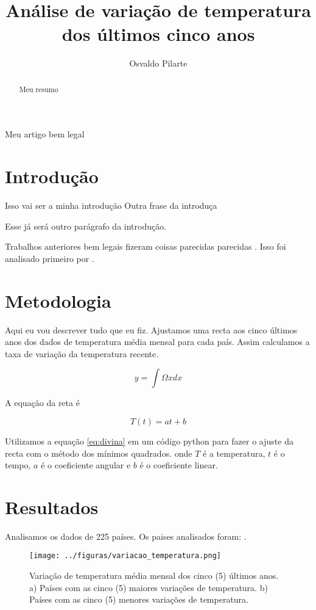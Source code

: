 \documentclass{article}
\begin{document}
\title{Análise de variação de temperatura dos últimos cinco anos}
\author{Osvaldo Pilarte}

\maketitle

\begin{abstract}
Meu resumo
\end{abstract}

Meu artigo bem legal

\section{Introdução}

Isso vai ser a minha introdução
Outra frase da introduça


Esse já será outro parágrafo da introdução.

Trabalhos anteriores bem legais fizeram coisas parecidas parecidas
\citep{Tohver_2006}.
Isso foi analisado primeiro por \citep{Tohver_2006}.

\section{Metodologia}

Aqui eu vou descrever tudo que eu fiz.
Ajustamos uma recta aos cinco últimos anos dos dados
de temperatura média mensal para cada país.
Assim calculamos a taxa de variação da temperatura recente.

\begin{equation}
y=\int\Omega x dx
\end{equation}

A equação da reta é

\begin{equation}
T(t) = a t + b
\label{eq:divina}
\end{equation}

\noindent

Utilizamos a equação \ref{eq:divina} em um código python para fazer o ajuste da recta com o método dos mínimos quadrados.
onde $T$ é a temperatura, $t$ é o tempo, $a$ é o coeficiente angular e $b$ é o coeficiente linear.

\section{Resultados}

Analisamos os dados de 225 países.
Os paises analisados foram: \Paises.



\begin{figure}
\texttt{[image: ../figuras/variacao\_temperatura.png]}
\caption{
    Variação de temperatura média mensal dos cinco 
    (5) últimos anos.
    a) Países com as cinco (5) maiores variações de temperatura.
    b) Países com as cinco (5) menores variações de temperatura.
}

\label{fig:variação}
\end{figure}



\end{document}
